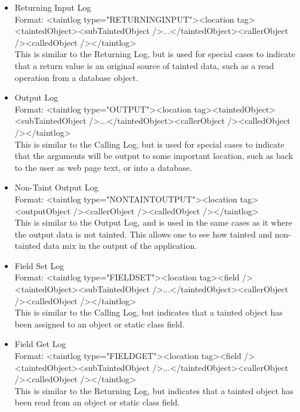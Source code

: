 \documentclass[msc,oneside]{ubcthesis}
\begin{document}
\begin{itemize}
\item Returning Input Log \\ 
Format: <taintlog type="RETURNINGINPUT"><location tag><taintedObject><subTaintedObject />...</taintedObject><callerObject /><calledObject /></taintlog> \\
This is similar to the Returning Log, but is used for special cases to indicate that a return value is an original source of tainted data, such as a read operation from a database object.

\item Output Log \\ 
Format: <taintlog type="OUTPUT"><location tag><taintedObject><subTaintedObject />...</taintedObject><callerObject /><calledObject /></taintlog> \\
This is similar to the Calling Log, but is used for special cases to indicate that the arguments will be output to some important location, such as back to the user as web page text, or into a database.

\item Non-Taint Output Log \\ 
Format: <taintlog type="NONTAINTOUTPUT"><location tag><outputObject /><callerObject /><calledObject /></taintlog> \\
This is similar to the Output Log, and is used in the same cases as it where the output data is not tainted. This allows one to see how tainted and non-tainted data mix in the output of the application.

\item Field Set Log \\
Format: <taintlog type="FIELDSET"><location tag><field /><taintedObject><subTaintedObject />...</taintedObject><callerObject /><calledObject /></taintlog> \\
This is similar to the Calling Log, but indicates that a tainted object has been assigned to an object or static class field.

\item Field Get Log \\
Format: <taintlog type="FIELDGET"><location tag><field /><taintedObject><subTaintedObject />...</taintedObject><callerObject /><calledObject /></taintlog> \\
This is similar to the Returning Log, but indicates that a tainted object has been read from an object or static class field.


\end{itemize}
\end{document}
